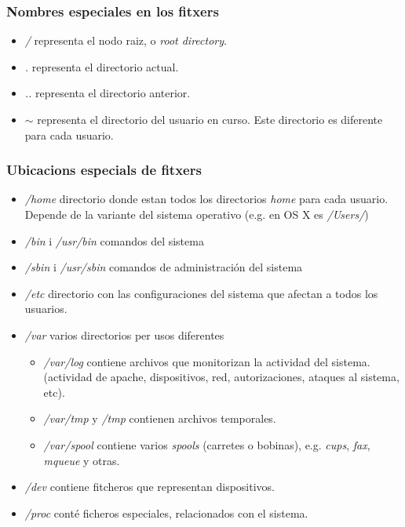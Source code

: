 \documentclass[colorlinks,10pt]{beamer}
\begin{document}
\begin{frame}
  \frametitle{Nombres especiales en los fitxers}
  \begin{itemize}
    \item<+-> \emph{/} representa el nodo raiz, o \emph{root directory}.
    \item<+-> \emph{.} representa el directorio actual.
    \item<+-> \emph{..} representa el directorio anterior.
    \item<+-> \emph{$\sim$} representa el directorio del usuario en
      curso. Este  directorio es diferente para cada usuario.
  \end{itemize}
\end{frame}

\begin{frame}
  \frametitle{Ubicacions especials de fitxers}
  \begin{itemize}
    \item<+-> \emph{/home} directorio donde estan todos los directorios
      \emph{home} para cada usuario. Depende de la variante del sistema operativo (e.g. en
      OS X es \emph{ /Users/})
    \item<+-> \emph{/bin} i \emph{/usr/bin}  comandos del sistema
    \item<+->  \emph{/sbin} i \emph{/usr/sbin}  comandos de administración del sistema
    \item<+-> \emph{/etc} directorio con las configuraciones del sistema que afectan a todos los usuarios.
    \item<+-> \emph{/var} varios directorios per usos diferentes
      \begin{itemize}
      \item<+-> \emph{/var/log} contiene archivos que monitorizan la
        actividad del sistema. (actividad de apache, dispositivos,
        red, autorizaciones, ataques al sistema, etc).
      \item<+-> \emph{/var/tmp} y \emph{/tmp} contienen archivos temporales.
      \item<+-> \emph{/var/spool} contiene varios \emph{spools} (carretes o
        bobinas),
        e.g. \emph{cups},    \emph{fax},     \emph{mqueue} y otras.  
      \end{itemize}
    \item<+-> \emph{/dev} contiene fitcheros que representan dispositivos.
    \item<+-> \emph{/proc} conté ficheros especiales, relacionados con el
      sistema.
 \end{itemize}
\end{frame}
\end{document}
